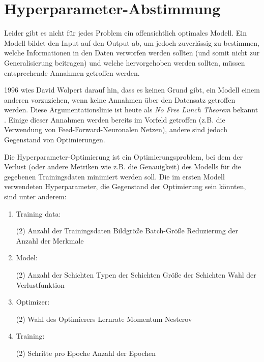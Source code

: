 \section{Hyperparameter-Abstimmung} \label{ch:hyper_parameter_tuning}

Leider gibt es nicht für jedes Problem ein offensichtlich optimales Modell.
Ein Modell bildet den Input auf den Output ab, um jedoch zuverlässig zu bestimmen, welche Informationen in den Daten verworfen werden sollten (und somit nicht zur Generalisierung beitragen) und welche hervorgehoben werden sollten, müssen entsprechende Annahmen getroffen werden.

1996 wies David Wolpert darauf hin, dass es keinen Grund gibt, ein Modell einem anderen vorzuziehen, wenn keine Annahmen über den Datensatz getroffen werden.
Diese Argumentationslinie ist heute als \textit{No Free Lunch Theorem} bekannt \cite{Wolpert1996}.
Einige dieser Annahmen werden bereits im Vorfeld getroffen (z.B. die Verwendung von Feed-Forward-Neuronalen Netzen), andere sind jedoch Gegenstand von Optimierungen.

Die Hyperparameter-Optimierung ist ein Optimierungsproblem, bei dem der Verlust (oder andere Metriken wie z.B. die Genauigkeit) des Modells für die gegebenen Trainingsdaten minimiert werden soll.
Die im ersten Modell verwendeten Hyperparameter, die Gegenstand der Optimierung sein könnten, sind unter anderem:

\begin{enumerate}
    \item Training data:
    \begin{tasks}(2)
        \task Anzahl der Trainingsdaten
        \task Bildgröße
        \task Batch-Größe
        \task Reduzierung der Anzahl der Merkmale
    \end{tasks}
    \item Model:
    \begin{tasks}(2)
        \task Anzahl der Schichten
        \task Typen der Schichten
        \task Größe der Schichten
        \task Wahl der Verlustfunktion
    \end{tasks}
    \item Optimizer:
    \begin{tasks}(2)
        \task Wahl des Optimierers
        \task Lernrate
        \task Momentum
        \task Nesterov
    \end{tasks}
    \item Training:
    \begin{tasks}(2)
        \task Schritte pro Epoche
        \task Anzahl der Epochen
    \end{tasks}
\end{enumerate}

